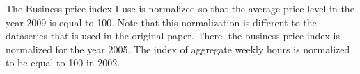 The Business price index I use is normalized so that the average price level in
the year 2009 is equal to 100. Note that this normalization is different to the
dataseries that is used in the original paper. There, the business price index
is normalized for the year 2005. The index of aggregate weekly hours is
normalized to be equal to 100 in 2002.
